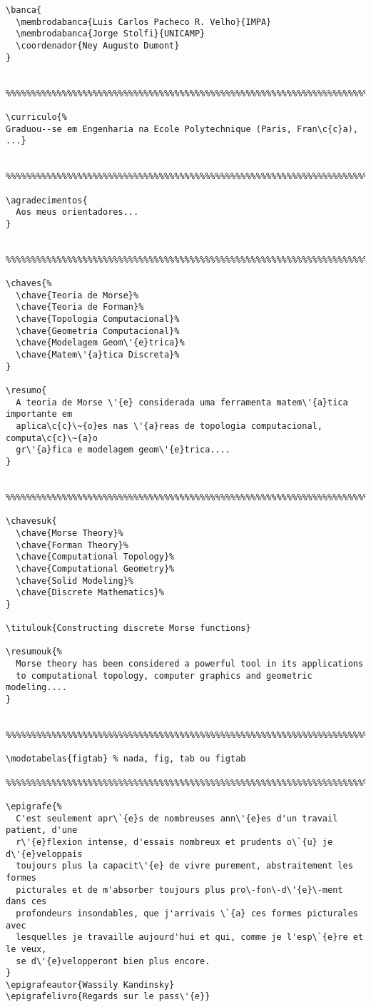 \documentclass[a4paper]{article}
\begin{document}
\begin{verbatim}
\banca{
  \membrodabanca{Luis Carlos Pacheco R. Velho}{IMPA}
  \membrodabanca{Jorge Stolfi}{UNICAMP}
  \coordenador{Ney Augusto Dumont}
}


%%%%%%%%%%%%%%%%%%%%%%%%%%%%%%%%%%%%%%%%%%%%%%%%%%%%%%%%%%%%%%%%%%%%%%%%%%%%%%%%

\curriculo{%
Graduou--se em Engenharia na Ecole Polytechnique (Paris, Fran\c{c}a), ...}


%%%%%%%%%%%%%%%%%%%%%%%%%%%%%%%%%%%%%%%%%%%%%%%%%%%%%%%%%%%%%%%%%%%%%%%%%%%%%%%%

\agradecimentos{
  Aos meus orientadores...
}


%%%%%%%%%%%%%%%%%%%%%%%%%%%%%%%%%%%%%%%%%%%%%%%%%%%%%%%%%%%%%%%%%%%%%%%%%%%%%%%%

\chaves{%
  \chave{Teoria de Morse}%
  \chave{Teoria de Forman}%
  \chave{Topologia Computacional}%
  \chave{Geometria Computacional}%
  \chave{Modelagem Geom\'{e}trica}%
  \chave{Matem\'{a}tica Discreta}%
}

\resumo{
  A teoria de Morse \'{e} considerada uma ferramenta matem\'{a}tica importante em
  aplica\c{c}\~{o}es nas \'{a}reas de topologia computacional, computa\c{c}\~{a}o
  gr\'{a}fica e modelagem geom\'{e}trica....
}


%%%%%%%%%%%%%%%%%%%%%%%%%%%%%%%%%%%%%%%%%%%%%%%%%%%%%%%%%%%%%%%%%%%%%%%%%%%%%%%%

\chavesuk{
  \chave{Morse Theory}%
  \chave{Forman Theory}%
  \chave{Computational Topology}%
  \chave{Computational Geometry}%
  \chave{Solid Modeling}%
  \chave{Discrete Mathematics}%
}

\titulouk{Constructing discrete Morse functions}

\resumouk{%
  Morse theory has been considered a powerful tool in its applications
  to computational topology, computer graphics and geometric modeling....
}


%%%%%%%%%%%%%%%%%%%%%%%%%%%%%%%%%%%%%%%%%%%%%%%%%%%%%%%%%%%%%%%%%%%%%%%%%%%%%%%%

\modotabelas{figtab} % nada, fig, tab ou figtab

%%%%%%%%%%%%%%%%%%%%%%%%%%%%%%%%%%%%%%%%%%%%%%%%%%%%%%%%%%%%%%%%%%%%%%%%%%%%%%%%

\epigrafe{%
  C'est seulement apr\`{e}s de nombreuses ann\'{e}es d'un travail patient, d'une
  r\'{e}flexion intense, d'essais nombreux et prudents o\`{u} je d\'{e}veloppais 
  toujours plus la capacit\'{e} de vivre purement, abstraitement les formes
  picturales et de m'absorber toujours plus pro\-fon\-d\'{e}\-ment dans ces
  profondeurs insondables, que j'arrivais \`{a} ces formes picturales avec
  lesquelles je travaille aujourd'hui et qui, comme je l'esp\`{e}re et le veux,
  se d\'{e}velopperont bien plus encore.
}
\epigrafeautor{Wassily Kandinsky}
\epigrafelivro{Regards sur le pass\'{e}}

\end{verbatim}
\end{document}
